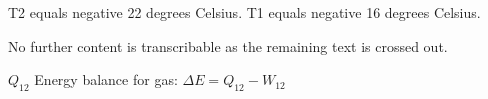 T2 equals negative 22 degrees Celsius.  
T1 equals negative 16 degrees Celsius.  

No further content is transcribable as the remaining text is crossed out.

\( Q_{12} \)  
Energy balance for gas:  
\( \Delta E = Q_{12} - W_{12} \)
